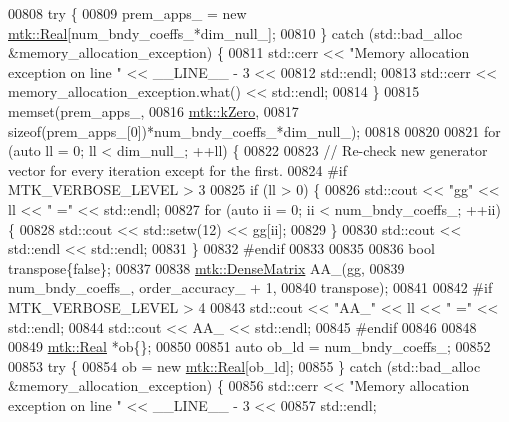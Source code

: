 \begin{DoxyCode}
{{00808   \textcolor{keywordflow}{try} \{
00809     prem\_apps\_ = \textcolor{keyword}{new} \hyperlink{group__c01-roots_gac080bbbf5cbb5502c9f00405f894857d}{mtk::Real}[num\_bndy\_coeffs\_*dim\_null\_];
00810   \} \textcolor{keywordflow}{catch} (std::bad\_alloc &memory\_allocation\_exception) \{
00811     std::cerr << \textcolor{stringliteral}{"Memory allocation exception on line "} << \_\_LINE\_\_ - 3 <<
00812       std::endl;
00813     std::cerr << memory\_allocation\_exception.what() << std::endl;
00814   \}
00815   memset(prem\_apps\_,
00816          \hyperlink{group__c01-roots_ga59a451a5fae30d59649bcda274fea271}{mtk::kZero},
00817          \textcolor{keyword}{sizeof}(prem\_apps\_[0])*num\_bndy\_coeffs\_*dim\_null\_);
00818 
00820 
00821   \textcolor{keywordflow}{for} (\textcolor{keyword}{auto} ll = 0; ll < dim\_null\_; ++ll) \{
00822 
00823     \textcolor{comment}{// Re-check new generator vector for every iteration except for the first.}
00824 \textcolor{preprocessor}{    #if MTK\_VERBOSE\_LEVEL > 3}
00825     \textcolor{keywordflow}{if} (ll > 0) \{
00826       std::cout << \textcolor{stringliteral}{"gg"} << ll << \textcolor{stringliteral}{" ="} << std::endl;
00827       \textcolor{keywordflow}{for} (\textcolor{keyword}{auto} ii = 0; ii < num\_bndy\_coeffs\_; ++ii) \{
00828         std::cout << std::setw(12) << gg[ii];
00829       \}
00830       std::cout << std::endl << std::endl;
00831     \}
00832 \textcolor{preprocessor}{    #endif}
00833 
00835 
00836     \textcolor{keywordtype}{bool} transpose\{\textcolor{keyword}{false}\};
00837 
00838     \hyperlink{classmtk_1_1DenseMatrix}{mtk::DenseMatrix} AA\_(gg,
00839                          num\_bndy\_coeffs\_, order\_accuracy\_ + 1,
00840                          transpose);
00841 
00842 \textcolor{preprocessor}{    #if MTK\_VERBOSE\_LEVEL > 4}
00843     std::cout << \textcolor{stringliteral}{"AA\_"} << ll << \textcolor{stringliteral}{" ="} << std::endl;
00844     std::cout << AA\_ << std::endl;
00845 \textcolor{preprocessor}{    #endif}
00846 
00848 
00849     \hyperlink{group__c01-roots_gac080bbbf5cbb5502c9f00405f894857d}{mtk::Real} *ob\{\};
00850 
00851     \textcolor{keyword}{auto} ob\_ld = num\_bndy\_coeffs\_;
00852 
00853     \textcolor{keywordflow}{try} \{
00854       ob = \textcolor{keyword}{new} \hyperlink{group__c01-roots_gac080bbbf5cbb5502c9f00405f894857d}{mtk::Real}[ob\_ld];
00855     \} \textcolor{keywordflow}{catch} (std::bad\_alloc &memory\_allocation\_exception) \{
00856       std::cerr << \textcolor{stringliteral}{"Memory allocation exception on line "} << \_\_LINE\_\_ - 3 <<
00857         std::endl;
}}
\end{DoxyCode}
